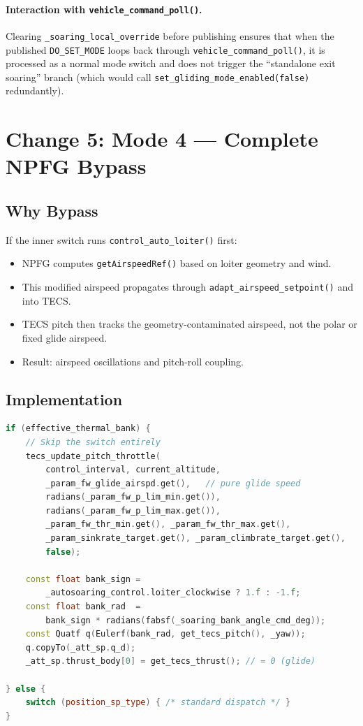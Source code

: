 \documentclass[12pt,a4paper]{article}
\begin{document}
\paragraph{Interaction with \texttt{vehicle\_command\_poll()}.}
Clearing \texttt{\_soaring\_local\_override} before publishing ensures that
when the published \texttt{DO\_SET\_MODE} loops back through
\texttt{vehicle\_command\_poll()}, it is processed as a normal mode switch
and does not trigger the ``standalone exit soaring'' branch (which would
call \texttt{set\_gliding\_mode\_enabled(false)} redundantly).

\section{Change 5: Mode 4 --- Complete NPFG Bypass}

\subsection{Why Bypass}

If the inner switch runs \texttt{control\_auto\_loiter()} first:
\begin{itemize}
  \item NPFG computes \texttt{getAirspeedRef()} based on loiter geometry
        and wind.
  \item This modified airspeed propagates through
        \texttt{adapt\_airspeed\_setpoint()} and into TECS.
  \item TECS pitch then tracks the geometry-contaminated airspeed, not the
        polar or fixed glide airspeed.
  \item Result: airspeed oscillations and pitch-roll coupling.
\end{itemize}

\subsection{Implementation}

\begin{lstlisting}[language=C++]
if (effective_thermal_bank) {
    // Skip the switch entirely
    tecs_update_pitch_throttle(
        control_interval, current_altitude,
        _param_fw_glide_airspd.get(),   // pure glide speed
        radians(_param_fw_p_lim_min.get()),
        radians(_param_fw_p_lim_max.get()),
        _param_fw_thr_min.get(), _param_fw_thr_max.get(),
        _param_sinkrate_target.get(), _param_climbrate_target.get(),
        false);

    const float bank_sign =
        _autosoaring_control.loiter_clockwise ? 1.f : -1.f;
    const float bank_rad  =
        bank_sign * radians(fabsf(_soaring_bank_angle_cmd_deg));
    const Quatf q(Eulerf(bank_rad, get_tecs_pitch(), _yaw));
    q.copyTo(_att_sp.q_d);
    _att_sp.thrust_body[0] = get_tecs_thrust(); // = 0 (glide)

} else {
    switch (position_sp_type) { /* standard dispatch */ }
}
\end{lstlisting}
\end{document}
